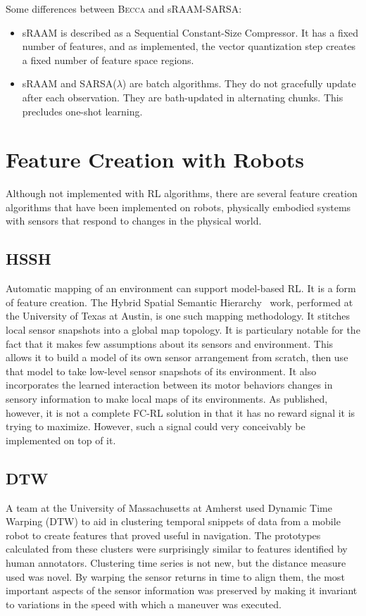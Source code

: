 Some differences between \textsc{Becca} and sRAAM-SARSA:

\begin{itemize}
\item sRAAM is described as a Sequential Constant-Size Compressor. It has a fixed number of features, and as implemented, the vector quantization step creates a fixed number of feature space regions.
\item sRAAM and SARSA($\lambda$) are batch algorithms. They do not gracefully update after each observation. They are bath-updated in alternating chunks. This precludes one-shot learning.
\end{itemize}


\section{Feature Creation with Robots}

Although not implemented with RL algorithms, there are several feature creation algorithms that have been implemented on robots, physically embodied systems with sensors that respond to changes in the physical world.

\subsection{HSSH} 
Automatic mapping of an environment can support model-based RL. It is a form of feature creation. The Hybrid Spatial Semantic Hierarchy~\cite{pierce97,beeson10} work, performed at the University of Texas at Austin, is one such mapping methodology. It stitches local sensor snapshots into a global map topology. It is particulary notable for the fact that it makes few assumptions about its sensors and environment. This allows it to build a model of its own sensor arrangement from scratch, then use that model to take low-level sensor snapshots of its environment. It also incorporates the learned interaction between its motor behaviors changes in sensory information to make local maps of its environments. As published, however, it is not a complete FC-RL solution in that it has no reward signal it is trying to maximize. However, such a signal could very conceivably be implemented on top of it.

\subsection{DTW} 
A team at the University of Massachusetts at Amherst used Dynamic Time Warping (DTW) to aid in clustering temporal snippets of data from a mobile robot to create features that proved useful in navigation. The prototypes calculated from these clusters were surprisingly similar to features identified by human annotators. Clustering time series is not new, but the distance measure used was novel. By warping the sensor returns in time to align them, the most important aspects of the sensor information was preserved by making it invariant to variations in the speed with which a maneuver was executed.


